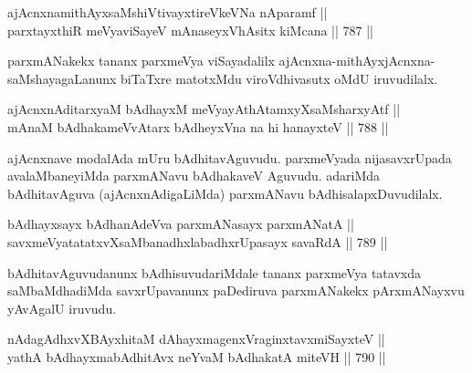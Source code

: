 
\begin{shl}
ajAcnxnamithAyxsaMshiVtivayxtireVkeVNa nAparamf || \\
parxtayxthiR meVyaviSayeV mAnaseyxVhAsitx kiMcana \hfill || 787 ||  
\end{shl}

\begin{artha} 
parxmANakekx tananx parxmeVya viSayadalilx ajAcnxna-mithAyxjAcnxna-saMshayagaLanunx biTaTxre matotxMdu viroVdhivasutx oMdU iruvudilalx.
\end{artha}


\begin{shl}
ajAcnxnAditarxyaM bAdhayxM meVyayAthAtamxyXsaMsharxyAtf || \\
mAnaM bAdhakameVvAtarx bAdheyxVna na hi hanayxteV \hfill || 788 ||  
\end{shl}

\begin{artha} 
ajAcnxnave modalAda mUru bAdhitavAguvudu. parxmeVyada nijasavxrUpada avalaMbaneyiMda parxmANavu bAdhakaveV Aguvudu. adariMda bAdhitavAguva (ajAcnxnAdigaLiMda) parxmANavu bAdhisalapxDuvudilalx.
\end{artha}





\begin{shl}
bAdhayxsayx bAdhanAdeVva parxmANasayx parxmANatA || \\
savxmeVyatatatxvXsaMbanadhxlabadhxrUpasayx savaRdA \hfill || 789 ||  
\end{shl}

\begin{artha}
bAdhitavAguvudanunx bAdhisuvudariMdale tananx parxmeVya tatavxda 
saMbaMdhadiMda savxrUpavanunx paDediruva parxmANakekx pArxmANayxvu yAvAgalU iruvudu.
\end{artha}


\begin{shl}
nAdagAdhxvX\s BAyxhitaM dAhayxmagenxVraginxtavxmiSayxteV || \\
yathA bAdhayxmabAdhitAvx neYvaM bAdhakatA miteVH \hfill || 790 ||  
\end{shl}

